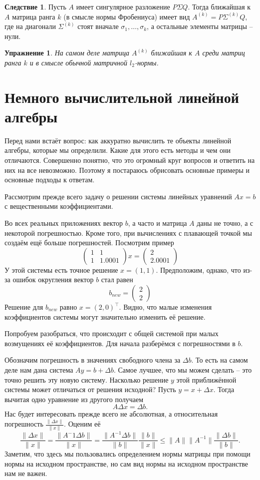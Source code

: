 \documentclass[10pt,a4paper,oneside]{book}
\newtheorem{uprz}{\color{violet!100!black} Упражнение}
\theoremstyle{definition}
\newtheorem{cor}{\color{green!45!black}Следствие}
\renewcommand{\leq}{\leqslant}
\def\crl{\begin{cor}}
\def\ecrl{\end{cor}}
\def\pmat{\begin{pmatrix}}
\def\epmat{\end{pmatrix}}
\def\upr{\begin{uprz}}
\def\eupr{\end{uprz}}
\begin{document}
\crl Пусть $A$ имеет сингулярное разложение $P\Sigma Q$. Тогда ближайшая к $A$ матрица ранга $k$ (в смысле нормы Фробениуса) имеет вид $A^{(k)}=P\Sigma^{(k)}Q$, где на диагонали $\Sigma^{(k)}$ стоят вначале $\sigma_1,\dots,\sigma_{k}$, а остальные элементы матрицы -- нули.
\ecrl

\upr На самом деле матрица $A^{(k)}$ ближайшая к $A$ среди матриц ранга $k$ и в смысле обычной матричной $l_2$-нормы. 
\eupr



\section{Немного вычислительной линейной алгебры}


Перед нами встаёт вопрос: как аккуратно вычислить те объекты линейной алгебры, которые мы определили. Какие для этого есть методы и чем они отличаются. Совершенно понятно, что это огромный круг вопросов и ответить на них на все невозможно. Поэтому я постараюсь обрисовать основные примеры и основные подходы к ответам.

Рассмотрим прежде всего задачу о решении системы линейных уравнений $Ax=b$ с вещественными коэффициентами. 

Во всех реальных приложениях вектор $b$, а часто и матрица $A$ даны не точно, а с некоторой погрешностью. Кроме того, при вычислениях с плавающей точкой мы создаём ещё больше погрешностей. Посмотрим  пример
$$ \pmat 1 & 1 \\ 1 & 1.0001 \epmat x = \pmat 2\\ 2.0001 \epmat$$
У этой системы есть точное решение $x=(1,1)$. Предположим, однако, что из-за ошибок округления вектор $b$ стал равен 
$$b_{new}=\pmat 2 \\ 2 \epmat$$
Решение для $b_{new}$ равно $x=(2,0)^\top$. Видно, что малые изменения коэффициентов системы могут значительно изменить её решение.

Попробуем разобраться, что происходит с общей системой при малых возмущениях её коэффициентов. Для начала разберёмся с погрешностями в $b$.

Обозначим погрешность в значениях свободного члена за $\Delta b$. То есть на самом деле нам дана система $Ay=b+\Delta b$. Самое лучшее, что мы можем сделать -- это точно решить эту новую систему. Насколько решение $y$ этой приближённой системы может отличаться от решения исходной? Пусть $y=x+\Delta x$. Тогда вычитая одно уравнение из другого получаем
$$A \Delta x= \Delta b.$$
Нас будет интересовать прежде всего не абсолютная, а относительная погрешность $\frac{\|\Delta x\|}{\|x\|}$. Оценим её
$$\frac{\|\Delta x\|}{\|x\|}=\frac{\|A^-1 \Delta b \|}{\|x\|}=\frac{\|A^{-1} \Delta b \|}{\|b\|} \frac{\|b\|}{\|x\|} \leq \|A\| \|A^{-1}\| \frac{\|\Delta b\|}{\|b\|}.$$
Заметим, что здесь мы пользовались определением нормы матрицы при помощи нормы на исходном пространстве, но сам вид нормы на исходном пространстве нам не важен.
\end{document}
